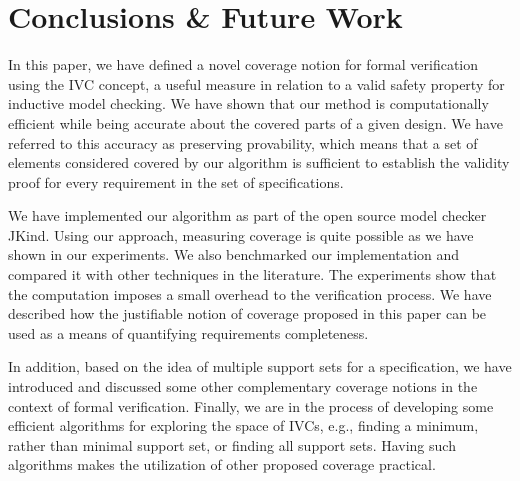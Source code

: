 \section{Conclusions \& Future Work}
\label{sec:conclusion}

In this paper, we have defined a novel coverage notion for formal verification using
the IVC concept, a useful measure in relation to
a valid safety property for inductive model checking. We have shown that our method
 is computationally efficient while 
 being accurate about the covered parts of a given design. 
 We have referred to this accuracy as preserving provability, which means 
 that a set of elements considered covered by our algorithm is sufficient 
 to establish the validity proof for every requirement in the set of specifications.
 
 We have implemented
our algorithm as part of the open source model checker JKind. Using our approach, measuring coverage is quite possible as we have shown in our experiments.
 We also benchmarked our implementation and compared it with other techniques in the literature. 
 The experiments show that the computation imposes a small overhead to the verification process. We have described how the justifiable notion of coverage proposed in this paper can be used as a
means of quantifying requirements completeness.
 
 In addition, based on the idea of multiple support sets for a specification, we 
 have introduced and discussed some other complementary coverage notions in the context of formal verification. Finally, we are in the process of developing some efficient algorithms for exploring the space of IVCs, e.g., finding a
minimum, rather than minimal support set, or finding all support sets. Having such algorithms makes the utilization of other proposed coverage practical.